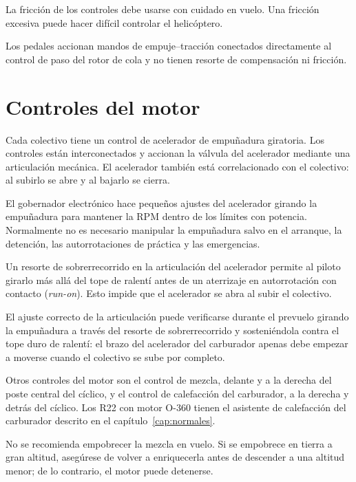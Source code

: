 \begin{precaucion}
La fricción de los controles debe usarse con cuidado en vuelo. Una fricción excesiva puede hacer difícil controlar el helicóptero.
\end{precaucion}

Los pedales accionan mandos de empuje--tracción conectados directamente al control de paso del rotor de cola y no tienen resorte de compensación ni fricción.

\section{Controles del motor}

Cada colectivo tiene un control de acelerador de empuñadura giratoria. Los controles están interconectados y accionan la válvula del acelerador mediante una articulación mecánica. El acelerador también está correlacionado con el colectivo: al subirlo se abre y al bajarlo se cierra.

El gobernador electrónico hace pequeños ajustes del acelerador girando la empuñadura para mantener la RPM dentro de los límites con potencia. Normalmente no es necesario manipular la empuñadura salvo en el arranque, la detención, las autorrotaciones de práctica y las emergencias.

Un resorte de sobrerrecorrido en la articulación del acelerador permite al piloto girarlo más allá del tope de ralentí antes de un aterrizaje en autorrotación con contacto (\emph{run-on}). Esto impide que el acelerador se abra al subir el colectivo.

El ajuste correcto de la articulación puede verificarse durante el prevuelo girando la empuñadura a través del resorte de sobrerrecorrido y sosteniéndola contra el tope duro de ralentí: el brazo del acelerador del carburador apenas debe empezar a moverse cuando el colectivo se sube por completo.

Otros controles del motor son el control de mezcla, delante y a la derecha del poste central del cíclico, y el control de calefacción del carburador, a la derecha y detrás del cíclico. Los R22 con motor O-360 tienen el asistente de calefacción del carburador descrito en el capítulo~\ref{cap:normales}.

\begin{precaucion}
No se recomienda empobrecer la mezcla en vuelo. Si se empobrece en tierra a gran altitud, asegúrese de volver a enriquecerla antes de descender a una altitud menor; de lo contrario, el motor puede detenerse.
\end{precaucion}

